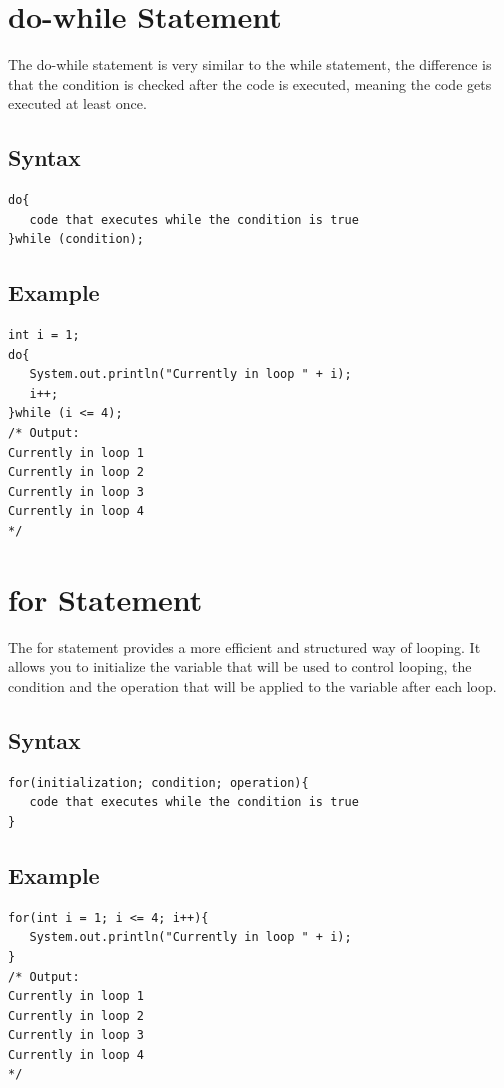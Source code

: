 \documentclass[a4paper]{article}
\begin{document}
\section*{do-while Statement}
The do-while statement is very similar to the while statement, the difference is
that the condition is checked after the code is executed, meaning the code gets
executed at least once.

\subsection*{Syntax}
\begin{lstlisting}
do{
   code that executes while the condition is true
}while (condition);
\end{lstlisting}

\subsection*{Example}
\begin{lstlisting}
int i = 1;
do{
   System.out.println("Currently in loop " + i);
   i++;
}while (i <= 4);
/* Output:
Currently in loop 1
Currently in loop 2
Currently in loop 3
Currently in loop 4
*/
\end{lstlisting}

\section*{for Statement}
The for statement provides a more efficient and structured way of looping. It
allows you to initialize the variable that will be used to control looping, the
condition and the operation that will be applied to the variable after each
loop.

\subsection*{Syntax}
\begin{lstlisting}
for(initialization; condition; operation){
   code that executes while the condition is true
}
\end{lstlisting}

\subsection*{Example}
\begin{lstlisting}
for(int i = 1; i <= 4; i++){
   System.out.println("Currently in loop " + i);
}
/* Output:
Currently in loop 1
Currently in loop 2
Currently in loop 3
Currently in loop 4
*/
\end{lstlisting}
\end{document}
